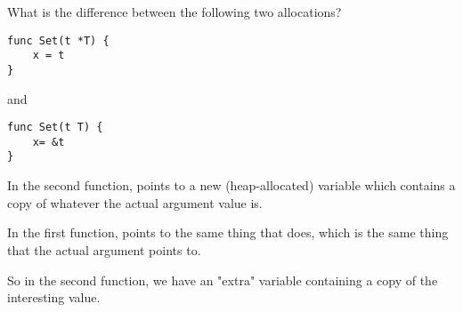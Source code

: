 \begin{Exercise}[title={Pointers},difficulty=6]
\label{ex:pointers}
\Question
What is the difference between the following two allocations?
\begin{lstlisting}[numbers=none]
func Set(t *T) {
    x = t
}
\end{lstlisting}
and
\begin{lstlisting}[numbers=none]
func Set(t T) {
    x= &t
}
\end{lstlisting}

\end{Exercise}

\begin{Answer}
\Question
In the second function,  points to a new
(heap-allocated) variable  which contains
a copy of whatever the actual argument value is.

In the first function,  points to the same thing
that  does, which is the same thing that the actual
argument points to.

So in the second function, we have an "extra" variable
containing a copy of the interesting value.
\end{Answer}
